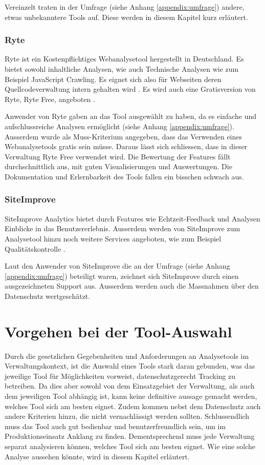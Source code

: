 Vereinzelt traten in der Umfrage (siehe Anhang \ref{appendix:umfrage}) andere, etwas unbekanntere Tools auf. Diese werden in diesem Kapitel kurz erläutert. 

\subsubsection{Ryte}

Ryte ist ein Kostenpflichtiges Webanalysetool hergestellt in Deutschland. Es bietet sowohl inhaltliche Analysen, wie auch Technische Analysen wie zum Beispiel JavaScript Crawling. Es eignet sich also für Webseiten deren Quellcodeverwaltung intern gehalten wird \parencite{RyteFeatures}. Es wird auch eine Gratisversion von Ryte, Ryte Free, angeboten \parencite{RyteFree}.

Anwender von Ryte gaben an das Tool ausgewählt zu haben, da es einfache und aufschlussreiche Analysen ermöglicht (siehe Anhang \ref{appendix:umfrage}). Ausserdem wurde als Muss-Kriterium angegeben, dass das Verwenden eines Webanalysetools gratis sein müsse. Daraus lässt sich schliessen, dass in dieser Verwaltung Ryte Free verwendet wird. Die Bewertung der Features fällt durchschnittlich aus, mit guten Visualisierungen und Auswertungen. Die Dokumentation und Erlernbarkeit des Tools fallen ein bisschen schwach aus. 

\subsubsection{SiteImprove}

SiteImprove Analytics bietet durch Features wie Echtzeit-Feedback und Analysen Einblicke in das Benutzererlebnis. Ausserdem werden von SiteImprove zum Analysetool hinzu noch weitere Services angeboten, wie zum Beispiel Qualitätskontrolle \parencite{SiteimproveFeatures}.

Laut den Anwender von SiteImprove die an der Umfrage (siehe Anhang \ref{appendix:umfrage}) beteiligt waren, zeichnet sich SiteImprove durch einen ausgezeichneten Support aus. Ausserdem werden auch die Massnahmen über den Datenschutz wertgeschätzt.

\section{Vorgehen bei der Tool-Auswahl}

Durch die gesetzlichen Gegebenheiten und Anforderungen an Analysetools im Verwaltungskontext, ist die Auswahl eines Tools stark daran gebunden, was das jeweilige Tool für Möglichkeiten vorweist, datenschutzgerecht Tracking zu betreiben. Da dies aber sowohl von dem Einsatzgebiet der Verwaltung, als auch dem jeweiligen Tool abhängig ist, kann keine definitive aussage gemacht werden,  welches Tool sich am besten eignet. Zudem kommen nebst dem Datenschutz auch andere Kriterien hinzu, die nicht vernachlässigt werden sollten. Schlussendlich muss das Tool auch gut bedienbar und benutzerfreundlich sein, um im Produktionseinsatz Anklang zu finden. Dementsprechend muss jede Verwaltung separat analysieren können, welches Tool sich am besten eignet. Wie eine solche Analyse aussehen könnte, wird in diesem Kapitel erläutert. 


